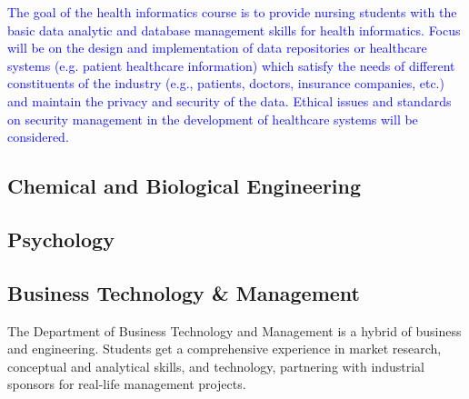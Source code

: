 \textcolor{blue}{The goal of the health informatics course is to provide nursing students with the basic data analytic and database management skills for health informatics. Focus will be on the design and implementation of data repositories or healthcare systems (e.g. patient healthcare information) which satisfy the needs of different constituents of the industry (e.g., patients, doctors, insurance companies, etc.) and maintain the privacy and security of the data. Ethical issues and standards on security management in the development of healthcare systems will be considered. }

\subsection{Chemical and Biological Engineering}


\subsection{Psychology}
\label{sec:research:psy}

\subsection{Business Technology \& Management}
The Department of Business Technology and Management is a hybrid of business and engineering. Students get a comprehensive experience in market research, conceptual and analytical skills, and technology, partnering with industrial sponsors for real-life management projects. 
